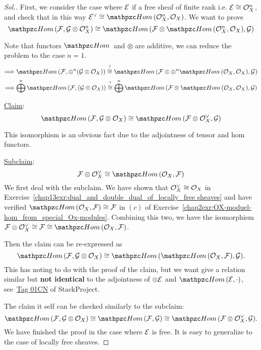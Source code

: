 \documentclass[11pt]{book} %
\begin{document}
\begin{proof}[Sol.]
First, we consider the case where ${\cal E}$ if a free sheaf of finite rank i.e. ${\cal E}\cong {\cal O}_X^n$, and check that in this way $\cale^\vee\cong\phom(\calo_X^n,\calo_X)$. We want to prove
$$
\phom(\calf,\calg\otimes\calo_X^n)\cong \phom(\calf\otimes \phom(\calo_X^n,\calo_X),\calg)
$$

Note that functors $\phom$ and $\otimes$ are additive, we can reduce the problem to the case $n=1$.
$$
\Lrta \phom(\calf,\oplus^n(\calg\otimes\calo_X))\overset{?}{\cong}\phom(\calf\otimes \oplus^n\phom(\calo_X,\calo_X),\calg)
$$
$$
\Lrta \bigoplus^n\phom(\calf,(\calg\otimes\calo_X))\overset{?}{\cong}\bigoplus^n\phom(\calf\otimes \phom(\calo_X,\calo_X),\calg)
$$

\underline{Claim}: 
$$
\phom(\calf,\calg\otimes\calo_X)\cong\phom(\calf\otimes \calo_X^\vee,\calg)
$$

This isomorphism is an obvious fact due to the adjointness of tensor and hom functors.

\underline{Subclaim}: 
$$
\calf\otimes\calo_X^\vee\cong \phom(\calo_X,\calf)
$$
 We first deal with the subclaim. We have shown that ${\cal O}_X^\vee\cong{\cal O}_X$ in Exercise~\ref{chap13exr:dual_and_double_dual_of_locally_free sheaves} and have verified $\phom(\calo_X,\calf)\cong\calf$ in $(c)$ of Exercise~\ref{chap2exr:OX-moduel-hom_from_special_Ox-modules}. Combining this two, we have the isomorphism $\calf\otimes\calo_X^\vee\cong\calf\cong\phom(\calo_X,\calf)$.

Then the claim can be re-expressed as
$$
\phom(\calf,\calg\otimes\calo_X)\cong\phom(\phom(\calo_X,\calf),\calg).
$$
This has noting to do with the proof of the claim, but we want give a relation similar but \textbf{not identical} to the adjointness of $\otimes {\cal E}$ and $\phom(\cale,\cdot)$, see~\href{http://stacks.math.columbia.edu/tag/01CN}{Tag 01CN} of StackProject. 

The claim it self can be checked similarly to the subclaim:
$$
\phom(\calf,\calg\otimes\calo_X)\cong\phom(\calf,\calg)\cong\phom(\calf\otimes \calo_X^\vee,\calg).
$$
We have finished the proof in the case where ${\cal E}$ is free. It is easy to generalize to the case of locally free sheaves.


\end{proof}
\end{document}
